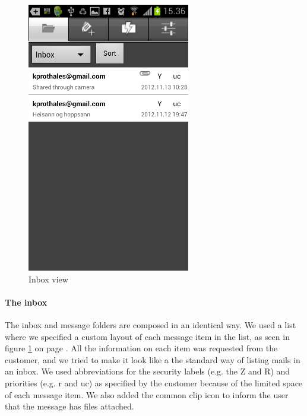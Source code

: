 \begin{figure}[H]
\begin{center}
\includegraphics{inbox_final}
\end{center}
\caption{Inbox view} \label{fig:frontend_inbox}
\end{figure}

\paragraph{The inbox}\hfill
\newline
The inbox and message folders are composed in an identical way. We used a list where we specified a custom layout of each message item in the list, as seen in figure \ref{fig:frontend_inbox} on page \pageref{fig:frontend_inbox}. All the information on each item was requested from the customer, and we tried to make it look like a the standard way of listing mails 
in an inbox. We used abbreviations for the security labels (e.g. the Z and R) and priorities (e.g. r and uc) as specified by the customer because of the limited space of each message item. We also added the common clip icon to inform the user that the message has files attached. 

\newpage

